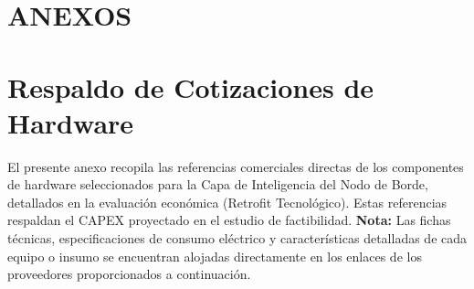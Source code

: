 
\chapter*{ANEXOS}

\appendix

% 
% 
% 

\chapter{Respaldo de Cotizaciones de Hardware}
\label{anexo:cotizaciones}

El presente anexo recopila las referencias comerciales directas de los componentes de hardware seleccionados para la Capa de Inteligencia del Nodo de Borde, detallados en la evaluación económica (Retrofit Tecnológico). Estas referencias respaldan el CAPEX proyectado en el estudio de factibilidad. \textbf{Nota:} Las fichas técnicas, especificaciones de consumo eléctrico y características detalladas de cada equipo o insumo se encuentran alojadas directamente en los enlaces de los proveedores proporcionados a continuación.

